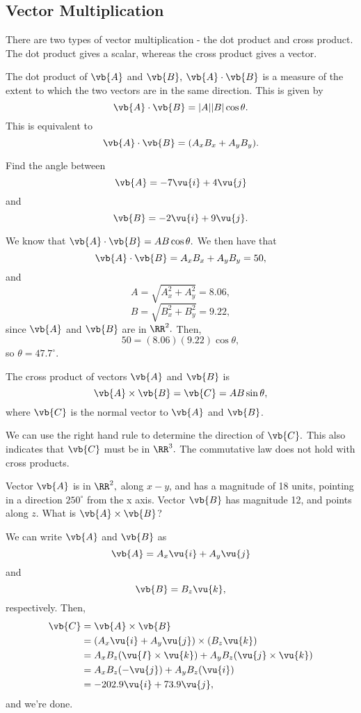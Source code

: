 \documentclass[11pt]{article}
\begin{document}
\subsection{Vector Multiplication}
There are two types of vector multiplication - the dot product and cross product. The dot product gives a scalar, whereas the cross product gives a vector.
\begin{defn}
	The dot product of $\vb{A}$ and $\vb{B},$ $\vb{A} \cdot \vb{B}$ is a measure of the extent to which the two vectors are in the same direction. This is given by
	\[\vb{A} \cdot \vb{B} = |A||B|\cos\theta.\]
	This is equivalent to
	\[\vb{A}\cdot\vb{B} = (A_xB_x +A_yB_y).\]
\end{defn}
\begin{example}
	Find the angle between
	\[\vb{A} = -7\vu{i} + 4\vu{j}\]
	and
	\[\vb{B} = -2\vu{i}+9\vu{j}.\]
\end{example}
\begin{solution}
	We know that $\vb{A}\cdot\vb{B} = AB\cos\theta.$ We then have that
	\[\vb{A}\cdot\vb{B} = A_xB_x+A_yB_y = 50,\]
	and
	\[A = \sqrt{A_x^2+A_y^2} = 8.06,\]
	\[B = \sqrt{B_x^2+B_y^2} = 9.22,\]
	since $\vb{A}$ and $\vb{B}$ are in $\RR^2.$ Then,
	\[50 = (8.06)(9.22)\cos\theta,\]
	so $\theta = \boxed{47.7^{\circ}}.$
\end{solution}
\begin{defn}
	The cross product of vectors $\vb{A}$ and $\vb{B}$ is
	\[\vb{A} \times \vb{B} = \vb{C} = AB\sin\theta,\]
	where $\vb{C}$ is the normal vector to $\vb{A}$ and $\vb{B}$.
\end{defn}
We can use the right hand rule to determine the direction of $\vb{C}.$ This also indicates that $\vb{C}$ must be in $\RR^3.$ The commutative law does not hold with cross products.
\begin{example}
	Vector $\vb{A}$ is in $\RR^2,$ along $x-y$, and has a magnitude of 18 units, pointing in a direction $250^{\circ}$ from the x axis. Vector $\vb{B}$ has magnitude 12, and points along $z$. What is $\vb{A}\times\vb{B}$?
\end{example}
\begin{solution}
	We can write $\vb{A}$ and $\vb{B}$ as
	\[\vb{A} = A_x\vu{i} + A_y\vu{j}\]
	and
	\[\vb{B} = B_z\vu{k},\]
	respectively. Then,
	\begin{align*}
		\vb{C} &= \vb{A} \times \vb{B} \\
		&= (A_x\vu{i} + A_y\vu{j}) \times (B_z\vu{k}) \\
		&= A_xB_z(\vu{I}\times\vu{k}) + A_yB_z(\vu{j}\times\vu{k}) \\
		&= A_xB_z(-\vu{j}) + A_yB_z(\vu{i}) \\
		&= -202.9\vu{i}+73.9\vu{j},
	\end{align*}
	and we're done.
\end{solution}
\end{document}
